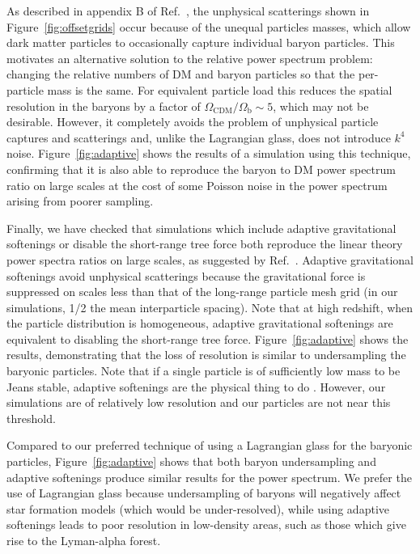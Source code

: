 \documentclass[a4paper,11pt]{article}
\begin{document}
As described in appendix B of Ref.~\cite{OLeary:2012}, the unphysical scatterings shown in Figure~\ref{fig:offsetgrids} occur because of the unequal particles masses, which allow dark matter particles to occasionally capture individual baryon particles. This motivates
an alternative solution to the relative power spectrum problem: changing the relative numbers of DM and baryon particles so that the per-particle mass is the same. For equivalent particle load this reduces the spatial resolution in the baryons by a factor of $\Omega_\mathrm{CDM}/\Omega_\mathrm{b} \sim 5$, which may not be desirable. However, it completely avoids the problem of unphysical particle captures and scatterings and, unlike the Lagrangian glass, does not introduce $k^4$ noise. Figure~\ref{fig:adaptive} shows the results of a simulation using this technique, confirming that it is also able to reproduce the baryon to DM power spectrum ratio on large scales at the cost of some Poisson noise in the power spectrum arising from poorer sampling.

Finally, we have checked that simulations which include adaptive gravitational softenings or disable the short-range tree force both reproduce the linear theory power spectra ratios on large scales, as suggested by Ref.~\cite{Angulo:2013}. Adaptive gravitational softenings avoid unphysical scatterings because the gravitational force is suppressed on scales less than that of the long-range particle mesh grid (in our simulations, 1/2 the mean interparticle spacing). Note that at high redshift, when the particle distribution is homogeneous, adaptive gravitational softenings are equivalent to disabling the short-range tree force.
Figure~\ref{fig:adaptive} shows the results, demonstrating that the loss of resolution is similar to undersampling the baryonic particles. Note that if a single particle is of sufficiently low mass to be Jeans stable, adaptive softenings are the physical thing to do \cite{Fire2:2018}. However, our simulations are of relatively low resolution and our particles are not near this threshold.

Compared to our preferred technique of using a Lagrangian glass for the baryonic particles, Figure~\ref{fig:adaptive} shows that both baryon undersampling and adaptive softenings produce similar results for the power spectrum. We prefer the use of Lagrangian glass because undersampling of baryons will negatively affect star formation models (which would be under-resolved), while using adaptive softenings leads to poor resolution in low-density areas, such as those which give rise to the Lyman-alpha forest.
\end{document}
